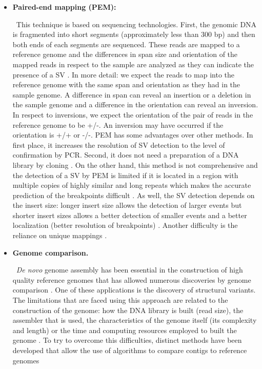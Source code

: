 \documentclass[a4paper,12pt]{article}
\begin{document}
\begin{itemize}
\item {\bf Paired-end mapping (PEM):} 

\
This technique is based on sequencing technologies. First, the genomic DNA is fragmented into short segments (approximately less than 300 bp) and then both ends of each segments are sequenced. These reads are mapped to a reference genome and the differences in span size and orientation of the mapped reads in respect to the sample are analyzed as they can indicate the presence of a SV \cite{alkan_genome_2011, korbel_paired-end_2007, medvedev_computational_2009}. In more detail: we expect the reads to map into the reference genome with the same span and orientation as they had in the sample genome. A difference in span can reveal an insertion or a deletion in the sample genome and a difference in the orientation can reveal an inversion. In respect to inversions, we expect the orientation of the pair of reads in the reference genome to be +/-. An inversion may have occurred if the orientation is +/+ or -/-. 
PEM has some advantages over other methods. In first place, it increases the resolution of SV detection to the level of confirmation by PCR. Second, it does not need a preparation of a DNA library by cloning \cite{korbel_paired-end_2007}. On the other hand, this method is not comprehensive \cite{alkan_genome_2011} and the detection of a SV by PEM is limited if it is located in a region with multiple copies of highly similar and long repeats which makes the accurate prediction of the breakpoints difficult \cite{alkan_genome_2011, medvedev_computational_2009,korbel_paired-end_2007}. As well, the SV detection depends on the insert size: longer insert size allows the detection of larger events but shorter insert sizes allows a better detection of smaller events and a better localization (better resolution of breakpoints) \cite{medvedev_computational_2009}. Another difficulty is the reliance on unique mappings \cite{medvedev_computational_2009}.

\item {\bf Genome comparison.} 

\
{\em De novo} genome assembly has been essential in the construction of high quality reference genomes that has allowed numerous discoveries by genome comparison \cite{chin_phased_2016}. One of these applications is the discovery of structural variants. The limitations that are faced using this approach are related to the construction of the genome: how the DNA library is built (read size), the assembler that is used, the characteristics of the genome itself (its complexity and length) or the time and computing resources employed to built the genome \cite{baker_novo_2012}. To try to overcome this difficulties, distinct methods have been developed that allow the use of algorithms  to compare contigs to reference genomes


\end{itemize}
\end{document}
